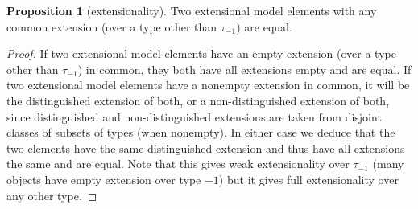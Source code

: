 \documentclass[112pt]{article}
\theoremstyle{definition}
\newtheorem{proposition}[theorem]{Proposition}
\theoremstyle{remark}
\newenvironment{annot}{\begin{center}\color{blue}\sl}{\end{center}}
\begin{document}
\begin{proposition}[extensionality]\label{prop:extensionality}
Two extensional model elements with any common extension (over a type other than $\tau_{-1}$) are equal.
\end{proposition}
\begin{proof}
If two extensional model elements have an empty extension (over a type other than $\tau_{-1}$) in common, they both have all extensions empty and are equal.  If two extensional model elements have a nonempty extension in common, it will be the distinguished extension of both, or a non-distinguished extension of both, since distinguished and non-distinguished extensions are taken from disjoint classes of subsets of types (when nonempty).
In either case we deduce that the two elements have the same distinguished extension and thus have all extensions the same and are equal.  Note that this gives weak extensionality over $\tau_{-1}$ (many objects have empty extension over type $-1$) but it gives full extensionality over any other type.
\end{proof}
\begin{comment}
\begin{description}
\item[A legacy notation from earlier versions which may be used:]  We introduce the notation $(\beta,\delta,D)$ where $\delta<\beta$ and  $D \subseteq \tau_\delta$.   This stands for the unique extensional element $x$ of $\tau_\beta^*$ such that $x \cap \tau_\delta = D$.  It should be clear that there is only one such object.  If $D$ is empty, it is the unique
element of $\tau_\beta^*$ with empty intersection with each $\tau_\gamma^*$ for $\gamma<\beta$.  If $\delta=-1$ and $D$ is nonempty, or if $\delta >-1$
and $D$ has an even number of iterated images under $A^{-1}$, then it is the unique element $x$ of of $\tau_\beta^*$ which is extensional and has distinguished extension $x \cap \tau_\delta$.  If $D$ is nonempty and has an odd number of iterated images under $A^{-1}$, let $A^{-1}(D) \subseteq \tau_\gamma$, and it is the same as $(\beta,\gamma,A^{-1}(D))$.  This notation is mainly for compatibility with previous versions of the paper, but may have its uses.
\end{description}
\begin{annot}
  I believe this notation is now unused in the paper.
  We still use it in the formalisation, although I think it may be cleaner to try to remove it.
  Update: the notation is used once in section 4.3.
\end{annot}

\end{comment}
\end{document}
